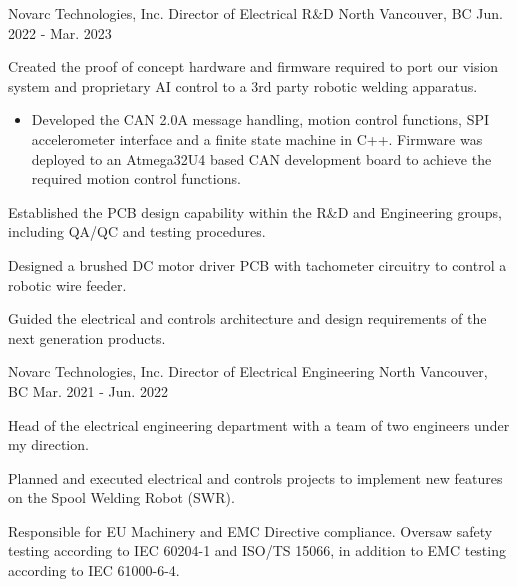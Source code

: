 \begin{cventries}
    \cventry
    {Novarc Technologies, Inc.} %
    {Director of Electrical R\&D} %
    {North Vancouver, BC} %
    {Jun. 2022 - Mar. 2023} %
    { %
        \begin{cvitems}
            \item {Created the proof of concept hardware and firmware required to port our vision system and proprietary AI control to a 3rd party robotic
                        welding apparatus.}
            \begin{itemize}
                \item {Developed the CAN 2.0A message handling, motion control functions, SPI accelerometer interface and a finite state machine in C++. Firmware was deployed to an Atmega32U4 based CAN development board to achieve the required motion control functions.}
            \end{itemize}
            \item {Established the PCB design capability within the R\&D and Engineering groups, including QA/QC and testing procedures.}
            \item {Designed a brushed DC motor driver PCB with tachometer circuitry to control a robotic wire feeder.}
            \item {Guided the electrical and controls architecture and design requirements of the next generation products.}
        \end{cvitems}
    }


    \cventry
    {Novarc Technologies, Inc.} %
    {Director of Electrical Engineering} %
    {North Vancouver, BC} %
    {Mar. 2021 - Jun. 2022} %
    { %
        \begin{cvitems}
            \item {Head of the electrical engineering department with a team of two engineers under my direction.}
            \item {Planned and executed electrical and controls projects to implement new features on the Spool Welding Robot (SWR).}
            \item {Responsible for EU Machinery and EMC Directive compliance. Oversaw safety testing according to IEC 60204-1 and ISO/TS 15066, in addition to EMC testing according to IEC 61000-6-4.}
        \end{cvitems}
    }


\end{cventries}
